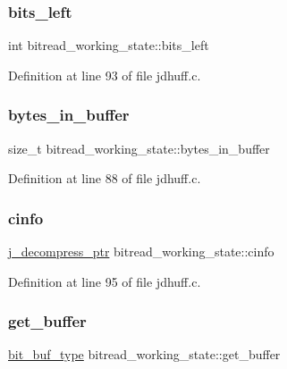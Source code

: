 \subsubsection{\texorpdfstring{bits\_left}{bits\_left}}
{\footnotesize\ttfamily int bitread\+\_\+working\+\_\+state\+::bits\+\_\+left}



Definition at line 93 of file jdhuff.\+c.

\mbox{\label{structbitread__working__state_a9564d55e83f5b154a50a84ffb4e45809}} 
\subsubsection{\texorpdfstring{bytes\_in\_buffer}{bytes\_in\_buffer}}
{\footnotesize\ttfamily size\+\_\+t bitread\+\_\+working\+\_\+state\+::bytes\+\_\+in\+\_\+buffer}



Definition at line 88 of file jdhuff.\+c.

\mbox{\label{structbitread__working__state_ae6ed0f717c279eac7ac54cec32cfaa3e}} 
\subsubsection{\texorpdfstring{cinfo}{cinfo}}
{\footnotesize\ttfamily \mbox{\hyperlink{jpeglib_8h_a00c7d78af44bd26a901c791ccfc1e178}{j\+\_\+decompress\+\_\+ptr}} bitread\+\_\+working\+\_\+state\+::cinfo}



Definition at line 95 of file jdhuff.\+c.

\mbox{\label{structbitread__working__state_a1b14cadab00deca48688b336c6a48664}} 
\subsubsection{\texorpdfstring{get\_buffer}{get\_buffer}}
{\footnotesize\ttfamily \mbox{\hyperlink{jdhuff_8c_ab2d47e546a8ed21c68e22f54535574a8}{bit\+\_\+buf\+\_\+type}} bitread\+\_\+working\+\_\+state\+::get\+\_\+buffer}



